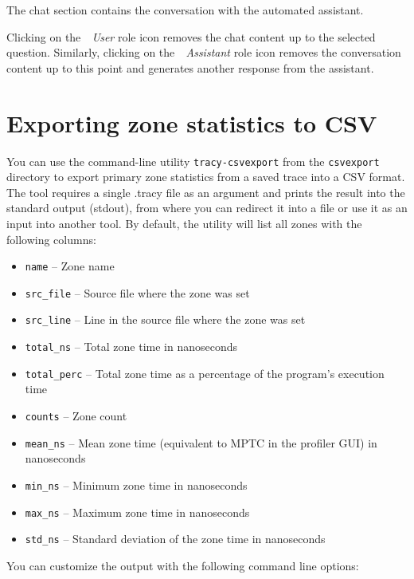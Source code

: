 \documentclass[hidelinks,titlepage,a4paper,twoside]{article}
\begin{document}
The chat section contains the conversation with the automated assistant.

Clicking on the~\emph{\faUser{}~User} role icon removes the chat content up to the selected question. Similarly, clicking on the~\emph{\faRobot{}~Assistant} role icon removes the conversation content up to this point and generates another response from the assistant.

\section{Exporting zone statistics to CSV}
\label{csvexport}

You can use the command-line utility \texttt{tracy-csvexport} from the \texttt{csvexport} directory to export primary zone statistics from a saved trace into a CSV format.
The tool requires a single .tracy file as an argument and prints the result into the standard output (stdout), from where you can redirect it into a file or use it as an input into another tool.
By default, the utility will list all zones with the following columns:

\begin{itemize}
  \item \texttt{name} -- Zone name
  \item \texttt{src\_file} -- Source file where the zone was set
  \item \texttt{src\_line} -- Line in the source file where the zone was set
  \item \texttt{total\_ns} -- Total zone time in nanoseconds
  \item \texttt{total\_perc} -- Total zone time as a percentage of the program's execution time
  \item \texttt{counts} -- Zone count
  \item \texttt{mean\_ns} -- Mean zone time (equivalent to MPTC in the profiler GUI) in nanoseconds
  \item \texttt{min\_ns} -- Minimum zone time in nanoseconds
  \item \texttt{max\_ns} -- Maximum zone time in nanoseconds
  \item \texttt{std\_ns} -- Standard deviation of the zone time in nanoseconds
\end{itemize}

You can customize the output with the following command line options:
\end{document}
